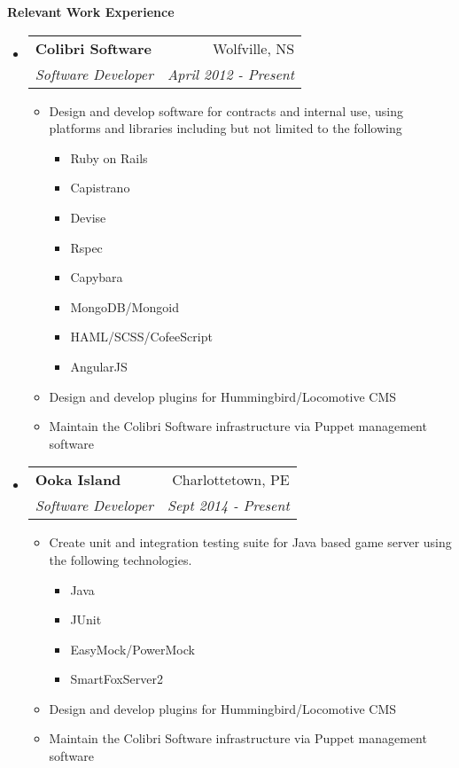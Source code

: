 \documentclass[letterpaper,11pt]{article}
\makeatletter
\newcommand{\resitem}[1]{\item #1 \vspace{-2pt}}
\newcommand{\resheading}[1]{{\large \colorbox{mygrey}{\begin{minipage}{\textwidth}{\textbf{#1 \vphantom{p\^{E}} }}\end{minipage}} }}
\newcommand{\ressubheading}[4]{
\begin{tabular*}{6.5in}{l@{\extracolsep{\fill}}r}
        \textbf{#1} & #2 \\
        \textit{#3} & \textit{#4} \\
\end{tabular*}\vspace{-6pt}}
\makeatother
\begin{document}
\newpage
\mywebheader
\resheading{Relevant Work Experience} %
    \begin{itemize}
        \item[]
            \ressubheading{Colibri Software}{Wolfville, NS}{Software Developer}{April 2012 - Present}
                \begin{itemize}
                    \resitem{Design and develop software for contracts and internal use, using platforms and libraries including but not limited to the following}
                    \begin{itemize}
                      \resitem{Ruby on Rails}
                      \resitem{Capistrano}
                      \resitem{Devise}
                      \resitem{Rspec}
                      \resitem{Capybara}
                      \resitem{MongoDB/Mongoid}
                      \resitem{HAML/SCSS/CofeeScript}
                      \resitem{AngularJS}
                    \end{itemize}
                    \resitem{Design and develop plugins for Hummingbird/Locomotive CMS}
                    \resitem{Maintain the Colibri Software infrastructure via Puppet management software}
                \end{itemize}
        \item[]
            \ressubheading{Ooka Island}{Charlottetown, PE}{Software Developer}{Sept 2014 - Present}
                \begin{itemize}
                    \resitem{Create unit and integration testing suite for Java based game server using the following technologies.}
                    \begin{itemize}
                      \resitem{Java}
                      \resitem{JUnit}
                      \resitem{EasyMock/PowerMock}
                      \resitem{SmartFoxServer2}
                    \end{itemize}
                    \resitem{Design and develop plugins for Hummingbird/Locomotive CMS}
                    \resitem{Maintain the Colibri Software infrastructure via Puppet management software}
                \end{itemize}
\begin{comment}
        \item[]
            \ressubheading{76 Minas Sea Cadets (DND)}{Windsor, NS}{Administration Officer}{Sept. 2014 - Present}
                \begin{itemize}
                    \resitem{Employed organization skills in maintaining online database of cadet documentation to ensure easy and consistent transfer of data

\end{comment}
\end{itemize}
\end{document}
